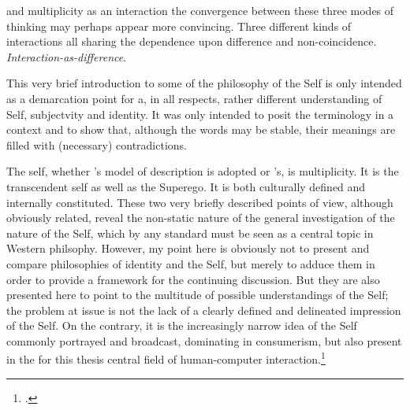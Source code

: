 and multiplicity as an interaction the convergence between these three modes of thinking may perhaps appear more convincing. Three different kinds of interactions all sharing the dependence upon difference and non-coincidence. \emph{Interaction-as-difference}.




This very brief introduction to some of the philosophy of the Self is only intended as a demarcation point for a, in all respects, rather different understanding of Self, subjectvity and identity. It was only intended to posit the terminology in a context and to show that, although the words may be stable, their meanings are filled with (necessary) contradictions. 

The self, whether \citeauthor{freud61}'s model of description is adopted or \citeauthor{sartre43}'s, is multiplicity. It is the transcendent self as well as the Superego. It is both culturally defined and internally constituted.
These two very briefly described points of view, although obviously related, reveal the non-static nature of the general investigation of the nature of the Self, which by any standard must be seen as a central topic in Western philsophy. However, my point here is obviously  not to present and compare philosophies of identity and the Self, but merely to adduce them in order to provide a framework for the continuing discussion. But they are also presented here to point to the multitude of possible understandings of the Self; the problem at issue is not the lack of a clearly defined and delineated impression of the Self. On the contrary, it is the increasingly narrow idea of the Self commonly portrayed and broadcast, dominating in consumerism, but also present in the for this thesis central field of human-computer interaction.\footcite[In a very readable essay, artist David Rokeby (whose installation \emph{Giver of Names} is mentioned in relation to the discussion on \hyperlink{sec:target:interaction-symbiosis}{man-computer symbiosis}.) points out the unfortunate and distorted mirror reflection the computer gives of its user: ``A standard GUI interface is a mirror that reflects back a severely misshapen human being with large hands, huge forefinger, one immense eye and moderate sized ears. The rest of the body is simply the location of backaches, neck strain, and repetitive stress injuries.'' The way we are being perceived as human beings will inevitably influence any view we may have of our Selves, as well as of any Other in relation to that Self.][]{rokeby98}

